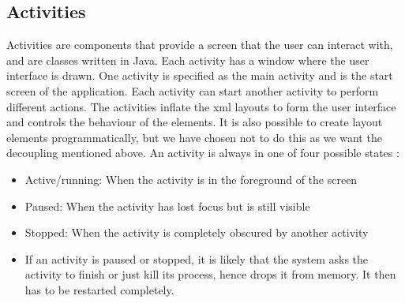 \subsection{Activities}
Activities are components that provide a screen that the user can interact with, and are classes written in Java. Each activity has a window where the user interface is drawn. One activity is specified as the main activity and is the start screen of the application. Each activity can start another activity to perform different actions. The activities inflate the \gls{xml} layouts to form the user interface and controls the behaviour of the elements. It is also possible to create layout elements programmatically, but we have chosen not to do this as we want the decoupling mentioned above.
\newline
\newline
An activity is always in one of four possible states \cite{bib:aas}:
\begin{itemize}
\item{}Active/running: When the activity is in the foreground of the screen
\item{}Paused: When the activity has lost focus but is still visible
\item{}Stopped: When the activity is completely obscured by another activity
\item{}If an activity is paused or stopped, it is likely that the system asks the activity to finish or just kill its process, hence drops it from memory. It then has to be restarted completely.
\end{itemize}

